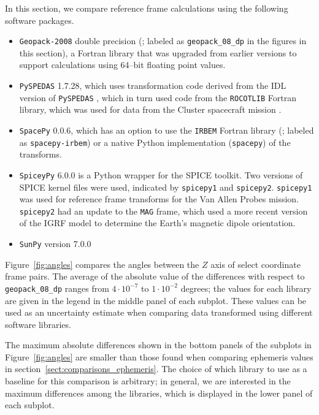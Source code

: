 \documentclass[draft]{agujournal2019}
\begin{document}
In this section, we compare reference frame calculations using the following software packages. 

\begin{itemize}
    \item \texttt{Geopack-2008} double precision (; labeled as \texttt{geopack\_08\_dp} in the figures in this section), a Fortran library that was upgraded from earlier versions to support calculations using 64--bit floating point values.
    \item \texttt{PySPEDAS} 1.7.28, which uses transformation code derived from the IDL version of \texttt{PySPEDAS} \cite{Angelopoulos2024IDL}, which in turn used code from the \texttt{ROCOTLIB} Fortran \cite{ROCOTLIB} library, which was used for data from the Cluster spacecraft mission \cite{ClusterTools1993}.
    \item \texttt{SpacePy} 0.0.6, which has an option to use the \texttt{IRBEM} Fortran library (; labeled as \texttt{spacepy-irbem}) or a native Python implementation (\texttt{spacepy}) of the transforms.
    \item \texttt{SpiceyPy} 6.0.0 is a Python wrapper for the SPICE toolkit. Two versions of SPICE kernel files were used, indicated by \texttt{spicepy1} and \texttt{spicepy2}. \texttt{spicepy1} was used for reference frame transforms for the Van Allen Probes mission. \texttt{spicepy2} had an update to the \texttt{MAG} frame, which used a more recent version of the IGRF model \cite{Alken2021} to determine the Earth's magnetic dipole orientation.
    \item \texttt{SunPy} version 7.0.0
\end{itemize}

Figure~\ref{fig:angles} compares the angles between the $Z$ axis of select coordinate frame pairs. The average of the absolute value of the differences with respect to \texttt{geopack\_08\_dp} ranges from $4\cdot 10^{-7}$ to $1\cdot 10^{-2}$ degrees; the values for each library are given in the legend in the middle panel of each subplot. These values can be used as an uncertainty estimate when comparing data transformed using different software libraries.

The maximum absolute differences shown in the bottom panels of the subplots in Figure~\ref{fig:angles} are smaller than those found when comparing ephemeris values in section~\ref{sect:comparisons_ephemeris}. The choice of which library to use as a baseline for this comparison is arbitrary; in general, we are interested in the maximum differences among the libraries, which is displayed in the lower panel of each subplot.
\end{document}
